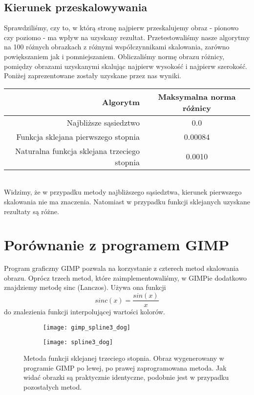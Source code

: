 \documentclass{mwart}
\theoremstyle{definition}
\begin{document}
\subsection{Kierunek przeskalowywania}
Sprawdziliśmy, czy to, w którą stronę najpierw przeskalujemy obraz - pionowo czy poziomo - ma wpływ na uzyskany rezultat. Przetestowaliśmy nasze algorytmy na 100 różnych obrazkach z różnymi współczynnikami skalowania, zarówno powiększaniem jak i pomniejszaniem. Obliczaliśmy normę obrazu różnicy, pomiędzy obrazami uzyskanymi skalując najpierw wysokość i najpierw szerokość. Poniżej zaprezentowane zostały uzyskane przez nas wyniki. \\

\begin{tabular}{|r|c|}
  \hline 
  Algorytm & Maksymalna norma różnicy\\
  \hline
  Najbliższe sąsiedztwo & 0.0 \\
  \hline
  Funkcja sklejana pierwszego stopnia & 0.00084 \\
  \hline
  Naturalna funkcja sklejana trzeciego stopnia &  0.0010 \\
  \hline
\end{tabular} \\

Widzimy, że w przypadku metody najbliższego sąsiedztwa, kierunek pierwszego skalowania nie ma znaczenia. Natomiast w przypadku funkcji sklejanych uzyskane rezultaty są różne.

\section{Porównanie z programem GIMP}
Program graficzny GIMP pozwala na korzystanie z czterech metod skalowania obrazu. Oprócz trzech metod, które zaimplementowaliśmy, w GIMPie dodatkowo znajdziemy metodę sinc (Lanczos). Używa ona funkcji $$sinc(x) = \frac{sin(x)}{x}$$ do znalezienia funkcji interpolującej wartości kolorów.

\begin{figure}[!h]
	\begin{subfigure}[b]{0.4\textwidth}
		\texttt{[image: gimp\_spline3\_dog]}
		\label{fig:f1}
	\end{subfigure}
	\hfill
	\begin{subfigure}[b]{0.49\textwidth}
		\texttt{[image: spline3\_dog]}
		\label{fig:f2}
	\end{subfigure}
	\caption*{Metoda funkcji sklejanej trzeciego stopnia. Obraz wygenerowany w programie GIMP po lewej, po prawej zaprogramowana metoda. Jak widać obrazki są praktycznie identyczne, podobnie jest w przypadku pozostałych metod.}
\end{figure}
\end{document}
